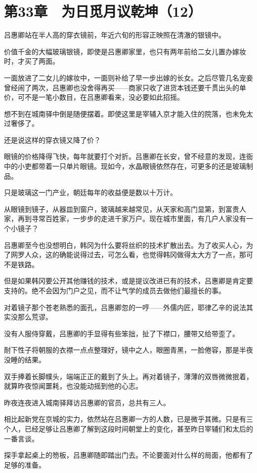 \section{第33章　为日觅月议乾坤（12）}

吕惠卿站在半人高的穿衣镜前，年近六旬的形容正映照在清澈的银镜中。

价值千金的大幅玻璃银镜，即使是吕惠卿家里，也只有两年前给二女儿置办嫁妆时，才买了两面。

一面放进了二女儿的嫁妆中，一面则补给了早一步出嫁的长女。之后尽管几名宠妾曾经闹了两次，吕惠卿也没舍得再买——商家只收了进货本钱还要千贯出头的单价，可不是一笔小数目，在吕惠卿看来，没必要如此招摇。

想不到在城南驿中倒是随便摆着。即使这里是宰辅入京才能入住的院落，也未免太过奢侈了。

还是说这样的穿衣镜又降了价？

眼镜的价格降得飞快，每年就要打个对折。吕惠卿在长安，曾不经意的发现，连衙中的小吏都带着一只单片眼镜。现如今，水晶眼镜依然存在，可更多的还是玻璃制品。

只是玻璃这一门产业，朝廷每年的收益便是数以十万计。

从眼镜到镜子，从器皿到窗户，玻璃越来越常见，从天家和高门显第，到富贵人家，再到寻常百姓家，一步步的走进千家万户。现在城市里面，有几户人家没有一个小镜子？

吕惠卿至今也没想明白，韩冈为什么要将丝织的技术扩散出去。为了收买人心，为了网罗人众，这的确能说得过去，可怎么看，也觉得韩冈做得太大方了一点，那可不是铁路。

但是如果韩冈要公开其他赚钱的技术，或是提议改进已有的技术，吕惠卿是肯定要支持的。绝不会因为门户之见，而不让气学的成员去做他们最擅长的事。

对着镜子那个苍老熟悉的面孔，吕惠卿忽的一哼——外儒内匠，耶律乙辛的说法其实没那么荒谬。

没有人服侍穿戴，吕惠卿的手显得有些笨拙，扯了下襟口，腰带又给带歪了。

耐下性子将朝服的衣襟一点点整理好，镜中之人，眼圈青黑，一脸倦容，那是半夜没睡的结果。

双手捧着长脚幞头，端端正正的戴到了头上。再对着镜子，薄薄的双唇微微抿着，就算昨夜惊闻噩耗，也没能动摇到他的心志。

昨夜连夜进入城南驿拜访吕惠卿的官员，总共有三人。

相比起新党在京城的实力，依然站在吕惠卿一方的人数，已是微乎其微。只是有三个人，已经足够让吕惠卿了解到这段时间朝堂上的变化，甚至昨日宰辅们和太后的一番言谈。

探手拿起桌上的笏板，吕惠卿随即踏出门去。不论要面对什么样的局面，他都有了足够的准备。

